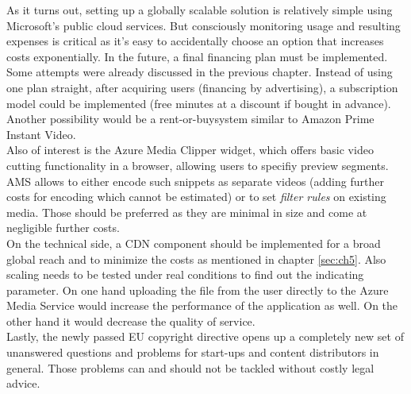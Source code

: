 As it turns out, setting up a globally scalable solution is relatively simple
using Microsoft's public cloud services. But consciously monitoring usage and resulting
expenses is critical as it's easy to accidentally choose an option that increases costs exponentially.
In the future, a final financing plan must be implemented. Some attempts were 
already discussed in the previous chapter. Instead of using one plan straight, 
after acquiring users (financing by advertising), a subscription model could be 
implemented (free minutes at a discount if bought in advance).
Another possibility would be a \glqq rent-or-buy\grqq system similar
to Amazon Prime Instant Video. \\%
Also of interest is the Azure Media Clipper widget, which offers basic video cutting
functionality in a browser, allowing users to specifiy preview segments. AMS allows to
either encode such snippets as separate videos (adding further costs for encoding which
cannot be estimated) or to set \textit{filter rules} on existing media. Those should be
preferred as they are minimal in size and come at negligible further costs.\\
On the technical side, a CDN component should be implemented for a broad global 
reach and to minimize the costs as mentioned in chapter \ref{sec:ch5}. Also 
scaling needs to be tested under real conditions to find out the indicating 
parameter.
On one hand uploading the file from the user directly to the Azure Media Service 
would increase the performance of the application as well. On the other hand it 
would decrease the quality of service.\\
Lastly, the newly passed EU copyright directive opens up a completely new set of 
unanswered questions and problems for start-ups and content distributors in general.
Those problems can and should not be tackled without costly legal advice.



